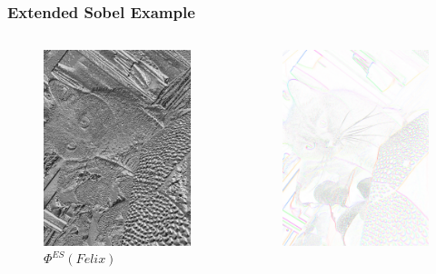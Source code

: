 \begin{frame}
\frametitle{Extended Sobel Example}
\begin{columns}
\begin{column}{0.5\textwidth}
\begin{figure}
	\centering
	\includegraphics[width=0.8\linewidth]{images/PhiFelix}
	\caption[$\Phi^{ES}(Felix)$]{$\Phi^{ES}(Felix)$}
	\label{fig:PhiFelix}
\end{figure}
\end{column}
\begin{column}{0.5\textwidth}
\begin{figure}
	\centering
	\includegraphics[width=0.8\linewidth]{images/PhiFelixColoured}

\end{figure}
\end{column}
\end{columns}
\end{frame}
